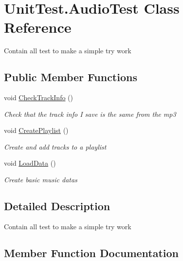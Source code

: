 \hypertarget{class_unit_test_1_1_audio_test}{}\section{Unit\+Test.\+Audio\+Test Class Reference}
\label{class_unit_test_1_1_audio_test}


Contain all test to make a simple try work  


\subsection*{Public Member Functions}
\begin{DoxyCompactItemize}
\item 
void \hyperlink{class_unit_test_1_1_audio_test_a94e4251cb6c610e3cc7e4db515060a0c}{Check\+Track\+Info} ()
\begin{DoxyCompactList}\small\item\em Check that the track info I save is the same from the mp3 \end{DoxyCompactList}\item 
void \hyperlink{class_unit_test_1_1_audio_test_a6f1473adeea374f0d01e0c78bbfe4c02}{Create\+Playlist} ()
\begin{DoxyCompactList}\small\item\em Create and add tracks to a playlist \end{DoxyCompactList}\item 
void \hyperlink{class_unit_test_1_1_audio_test_a8991e38cfa40fab3ae4b2ae355ac2738}{Load\+Data} ()
\begin{DoxyCompactList}\small\item\em Create basic music datas \end{DoxyCompactList}\end{DoxyCompactItemize}


\subsection{Detailed Description}
Contain all test to make a simple try work 



\subsection{Member Function Documentation}
\mbox{\label{class_unit_test_1_1_audio_test_a94e4251cb6c610e3cc7e4db515060a0c}} 
